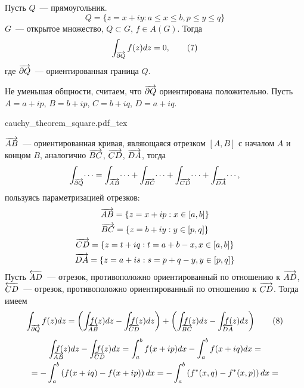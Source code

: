 \documentclass[main]{subfiles}
\begin{document}
\begin{theorem}\label{2:cauchy_square}
    Пусть $Q$~--- прямоугольник.
    \[Q = \{z = x + iy: a \le x \le b, p \le y \le q\}\]
    $G$~--- открытое множество, $Q \subset G$, $f \in A(G)$.
    Тогда
    \[\AnClOrInt[\AnClOrCurve[\partial Q]] f(z) dz = 0, \tag{7}\]
    где $\AnClOrCurve[\partial Q]$~--- ориентированная граница $Q$.
\end{theorem}
\begin{longProof}
    Не уменьшая общности, считаем, что $\AnClOrCurve[\partial Q]$ ориентирована положительно.
    Пусть $A = a + ip$, $B = b + ip$, $C = b + iq$, $D = a + iq$.
    \begin{center}
        {cauchy_theorem_square.pdf_tex}
    \end{center}
    $\AnClOrCurve[AB]$~--- ориентированная кривая, являющаяся отрезком $[A, B]$ с началом $A$ и концом $B$, аналогично $\AnClOrCurve[BC]$, $\AnClOrCurve[CD]$, $\AnClOrCurve[DA]$, тогда
    \[\AnClOrInt[\AnClOrCurve[\partial Q]] \dotsi = \AnClOrInt[\AnClOrCurve[AB]] \dotsi + \AnClOrInt[\AnClOrCurve[BC]] \dotsi + \AnClOrInt[\AnClOrCurve[CD]] \dotsi + \AnClOrInt[\AnClOrCurve[DA]] \dotsi,\]
    пользуясь параметризацией отрезков:
    \begin{gather*}
        \AnClOrCurve[AB] = \{z = x + ip: x \in [a,b]\} \\
        \AnClOrCurve[BC] = \{z = b + iy: y \in [p,q]\} \\
        \AnClOrCurve[CD] = \{z = t + iq: t = a + b - x, x \in [a,b]\}\\
        \AnClOrCurve[DA] = \{z = a + is: s = p + q - y, y \in [p,q]\}
    \end{gather*}
    Пусть $\ClOrCurve[AD]$~--- отрезок, противоположно ориентированный по отношению к $\AnClOrCurve[AD]$, $\ClOrCurve[CD]$~--- отрезок, противоположно ориентированный по отношению к $\AnClOrCurve[CD]$.
    Тогда имеем
    \[ \AnClOrInt[\AnClOrCurve[\partial Q]] f(z) dz = \left( \AnClOrInt[\mathrlap{\AnClOrCurve[AB]}] f(z) dz - \ClOrInt[\mathrlap{\ClOrCurve[CD]}] f(z) dz \right) + \left( \AnClOrInt[\mathrlap{\AnClOrCurve[BC]}] f(z) dz - \ClOrInt[\mathrlap{\ClOrCurve[DA]}] f(z) dz \right) \tag{8} \]
    \begin{multline*}
        \AnClOrInt[\mathrlap{\AnClOrCurve[AB]}] f(z) dz - \ClOrInt[\mathrlap{\ClOrCurve[CD]}] f(z) dz = \int_{a}^{b} f(x + ip) dx - \int_{a}^{b} f(x + iq) dx = \\
        = - \int_{a}^{b} \left(f(x + iq) - f(x + ip)\right) dx = - \int_{a}^{b} \left(f^*(x, q) - f^*(x, p)\right) dx = \\

\end{multline*}
\end{longProof}
\end{document}
